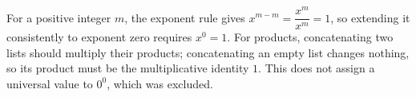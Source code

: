 For a positive integer $m$, the exponent rule gives $x^{m-m}=\dfrac{x^m}{x^m}=1$, so extending it consistently to exponent zero requires $x^0=1$. For products, concatenating two lists should multiply their products; concatenating an empty list changes nothing, so its product must be the multiplicative identity $1$. This does not assign a universal value to $0^0$, which was excluded.
